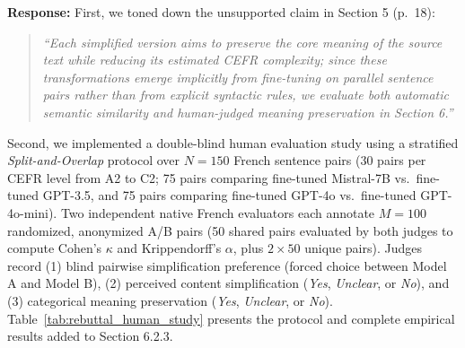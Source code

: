 \documentclass[11pt,a4paper]{article}
\begin{document}
\noindent\textbf{Response:}
First, we toned down the unsupported claim in Section 5 (p.\ 18):
\begin{quote}
\textit{``Each simplified version aims to preserve the core meaning of the source text while reducing its estimated CEFR complexity; since these transformations emerge implicitly from fine-tuning on parallel sentence pairs rather than from explicit syntactic rules, we evaluate both automatic semantic similarity and human-judged meaning preservation in Section 6.''}
\end{quote}
Second, we implemented a double-blind human evaluation study using a stratified \textit{Split-and-Overlap} protocol over $N = 150$ French sentence pairs (30 pairs per CEFR level from A2 to C2; 75 pairs comparing fine-tuned Mistral-7B vs.\ fine-tuned GPT-3.5, and 75 pairs comparing fine-tuned GPT-4o vs.\ fine-tuned GPT-4o-mini). Two independent native French evaluators each annotate $M = 100$ randomized, anonymized A/B pairs (50 shared pairs evaluated by both judges to compute Cohen's $\kappa$ and Krippendorff's $\alpha$, plus $2 \times 50$ unique pairs). Judges record (1) blind pairwise simplification preference (forced choice between Model A and Model B), (2) perceived content simplification (\textit{Yes}, \textit{Unclear}, or \textit{No}), and (3) categorical meaning preservation (\textit{Yes}, \textit{Unclear}, or \textit{No}). Table~\ref{tab:rebuttal_human_study} presents the protocol and complete empirical results added to Section 6.2.3.
\end{document}
